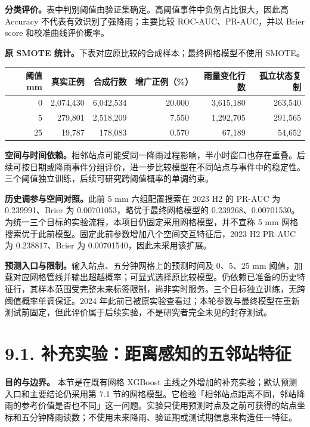 \documentclass[UTF8,fontset=fandol,10pt,a4paper,landscape]{ctexart}
\begin{document}
\textbf{分类评价。}表中判别阈值由验证集确定。高阈值事件中负例占比很大，因此高 Accuracy 不代表有效识别了强降雨；主要比较 ROC-AUC、PR-AUC，并以 Brier score 和校准曲线评价概率。

\textbf{原 SMOTE 统计。}下表对应原比较的合成样本；最终网格模型不使用 SMOTE。

\begin{center}\begin{tabular}{rrrrrr}\toprule
阈值 mm & 真实正例 & 合成行数 & 增广正例（\%） & 雨量变化行数 & 孤立状态复制\\\midrule
0 & 2,074,430 & 6,042,534 & 20.000 & 3,615,180 & 263,540\\
5 & 279,801 & 2,518,209 & 7.550 & 1,292,705 & 291,565\\
25 & 19,787 & 178,083 & 0.570 & 67,189 & 54,652\\
\bottomrule\end{tabular}\end{center}

\textbf{空间与时间依赖。}相邻站点可能受同一降雨过程影响，半小时窗口也存在重叠。后续可按日期或降雨事件分组评价，进一步比较模型在不同站点与事件中的稳定性。三个阈值独立训练，后续可研究跨阈值概率的单调约束。

\textbf{历史调参与空间对照。}此前 5 mm 六组配置搜索在 2023 H2 的 PR-AUC 为 0.239991、Brier 为 0.00701053，略优于最终网格模型的 0.239268、0.00701530。为统一三个目标的实验流程，本项目仍固定采用网格模型，并不宣称 5 mm 网格搜索优于此前模型。固定此前参数增加八个空间交互特征后，2023 H2 PR-AUC 为 0.238817、Brier 为 0.00701540，因此未采用该扩展。

\textbf{预测入口与限制。}输入站点、五分钟网格上的预测时间及 0、5、25 mm 阈值，加载对应网格管线并输出超越概率；可显式选择原比较模型。仍依赖已准备的历史特征行，其样本范围受完整未来标签限制，尚非实时服务。三个目标独立训练，无跨阈值概率单调保证。2024 年此前已被原实验查看过；本轮参数与最终模型在重新测试前固定，但此评价属于后续实验，不是研究者完全未见的封存测试。



\clearpage
\section*{9.1. 补充实验：距离感知的五邻站特征}

\textbf{目的与边界。} 本节是在既有网格 XGBoost 主线之外增加的补充实验；默认预测入口和主要结论仍采用第 7.1 节的网格模型。它检验「相邻站点距离不同，邻站降雨的参考价值是否也不同」这一问题。实验只使用预测时点及之前可获得的站点坐标和五分钟降雨读数；不使用未来降雨、验证期或测试期信息来构造任一特征。
\end{document}
